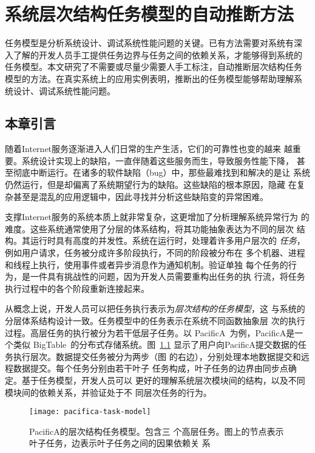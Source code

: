 \chapter{系统层次结构任务模型的自动推断方法}
\label{chap:scalpel}

任务模型是分析系统设计、调试系统性能问题的关键。已有方法需要对系统有深
入了解的开发人员手工提供任务边界与任务之间的依赖关系，才能够得到系统的
任务模型。本文研究了不需要或尽量少需要人手工标注，自动推断层次结构任务
模型的方法。在真实系统上的应用实例表明，推断出的任务模型能够帮助理解系
统设计、调试系统性能问题。

\section{本章引言}

随着Internet服务逐渐进入人们日常的生产生活，它们的可靠性也变的越来
越重要。系统设计实现上的缺陷，一直伴随着这些服务而生，导致服务性能下降，
甚至彻底中断运行。在诸多的软件缺陷（bug）中，那些最难找到和解决的是让
系统仍然运行，但是却偏离了系统期望行为的缺陷。这些缺陷的根本原因，隐藏
在复杂甚至是混乱的应用逻辑中，因此寻找并分析这些缺陷变的异常困难。

支撑Internet服务的系统本质上就非常复杂，这更增加了分析理解系统异常行为
的难度。这些系统通常使用了分层的体系结构，将其功能抽象表达为不同的层次
结构。其运行时具有高度的并发性。系统在运行时，处理着许多用户层次的
\emph{任务}，例如用户请求，任务被分成许多阶段执行，不同的阶段被分布在
多个机器、进程和线程上执行，使用事件或者异步消息作为通知机制。验证单独
每个任务的行为，是一件具有挑战性的问题，因为开发人员需要重构出任务的执
行流，将任务执行过程中的各个阶段重新连接起来。

从概念上说，开发人员可以把任务执行表示为\emph{层次结构的任务模型}，这
与系统的分层体系结构设计一致。任务模型中的任务表示在系统不同函数抽象层
次的执行过程。高层任务的执行被分为若干低层子任务。以
PacificA~\cite{pacifica}为例，PacificA是一个类似
BigTable~\cite{bigtable}的分布式存储系统。图~\ref{fig:pacifica_model}
显示了用户向PacificA提交数据的任务执行层次。数据提交任务被分为两步（图
的右边），分别处理本地数据提交和远程数据提交。每个任务分别由若干{叶子
任务}构成，叶子任务的边界由{同步点}确定。基于任务模型，开发人员可以
更好的理解系统层次模块间的结构，以及不同模块间的依赖关系，并验证处于不
同层次任务的行为。

\begin{figure}
  \centering
  \begin{minipage}{1.0\linewidth}
    \centering
    \texttt{[image: pacifica-task-model]}
    \parbox{0.8\linewidth}{\caption{PacificA的层次结构任务模型。包含三
    个高层任务。图上的节点表示叶子任务，边表示叶子任务之间的因果依赖关
    系}
    \label{fig:pacifica_model}}
  \end{minipage}
\end{figure}

